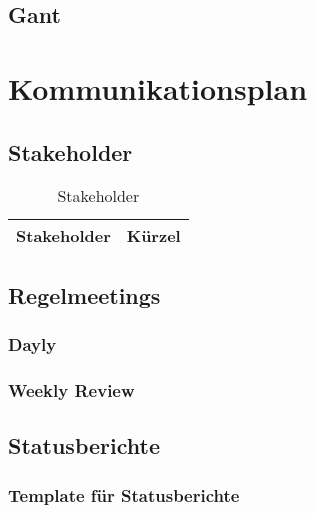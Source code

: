 \subsection{Gant} %

\section{Kommunikationsplan}
\subsection{Stakeholder}
\begin{table}[H]
    \renewcommand{\arraystretch}{1.1}
    \begin{center}
        \begin{tabular}{l|l}
            \textbf{Stakeholder} & \textbf{Kürzel}\\\hline
            
            
            
            
        \end{tabular}
    \end{center}
    \caption{Stakeholder}
\end{table}
\subsection{Regelmeetings} %

\subsubsection{Dayly}


\subsubsection{Weekly Review}



\subsection{Statusberichte} %


\subsubsection{Template für Statusberichte}



